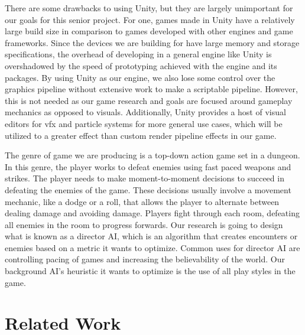 \documentclass[12pt]{article}
\begin{document}
There are some drawbacks to using Unity, but they are largely unimportant for our goals for this senior project. For one, games made in Unity have a relatively large build size in comparison to games developed with other engines and game frameworks. Since the devices we are building for have large memory and storage specifications, the overhead of developing in a general engine like Unity is overshadowed by the speed of prototyping achieved with the engine and its packages. By using Unity as our engine, we also lose some control over the graphics pipeline without extensive work to make a scriptable pipeline. However, this is not needed as our game research and goals are focused around gameplay mechanics as opposed to visuals. Additionally, Unity provides a host of visual editors for vfx and particle systems for more general use cases, which will be utilized to a greater effect than custom render pipeline effects in our game.

The genre of game we are producing is a top-down action game set in a dungeon. In this genre, the player works to defeat enemies using fast paced weapons and strikes. The player needs to make moment-to-moment decisions to succeed in defeating the enemies of the game. These decisions usually involve a movement mechanic, like a dodge or a roll, that allows the player to alternate between dealing damage and avoiding damage. Players fight through each room, defeating all enemies in the room to progress forwards. Our research is going to design what is known as a director AI, which is an algorithm that creates encounters or enemies based on a metric it wants to optimize. Common uses for director AI are controlling pacing of games and increasing the believability of the world. Our background AI's heuristic it wants to optimize is the use of all play styles in the game.



\section{Related Work}
\end{document}

